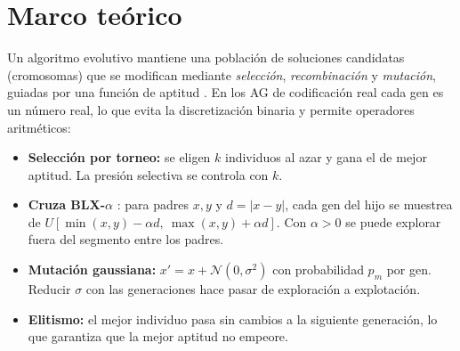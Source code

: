\documentclass[10pt,letterpaper]{article}
\begin{document}
\section{Marco teórico}
Un algoritmo evolutivo mantiene una población de soluciones candidatas (cromosomas) que se modifican mediante \emph{selección}, \emph{recombinación} y \emph{mutación}, guiadas por una función de aptitud \cite[cap.~8]{engelbrecht}. En los AG de codificación real \cite[cap.~9]{engelbrecht} cada gen es un número real, lo que evita la discretización binaria y permite operadores aritméticos:
\begin{itemize}\setlength\itemsep{0em}
\item \textbf{Selección por torneo:} se eligen $k$ individuos al azar y gana el de mejor aptitud. La presión selectiva se controla con $k$.
\item \textbf{Cruza BLX-$\alpha$} \cite{blx}: para padres $x,y$ y $d=|x-y|$, cada gen del hijo se muestrea de $U[\min(x,y)-\alpha d,\ \max(x,y)+\alpha d]$. Con $\alpha>0$ se puede explorar fuera del segmento entre los padres.
\item \textbf{Mutación gaussiana:} $x' = x + \mathcal{N}(0,\sigma^2)$ con probabilidad $p_m$ por gen. Reducir $\sigma$ con las generaciones hace pasar de exploración a explotación.
\item \textbf{Elitismo:} el mejor individuo pasa sin cambios a la siguiente generación, lo que garantiza que la mejor aptitud no empeore.
\end{itemize}

\end{document}
